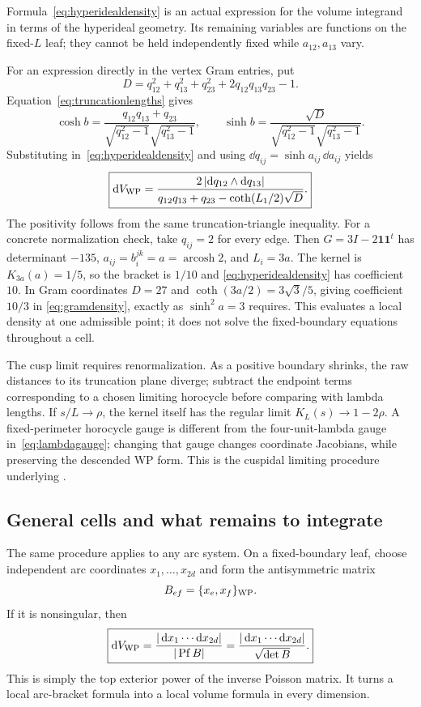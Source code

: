 Formula~\eqref{eq:hyperidealdensity} is an actual expression for the volume
integrand in terms of the hyperideal geometry. Its remaining variables are
functions on the fixed-$L$ leaf; they cannot be held independently fixed
while $a_{12},a_{13}$ vary.

For an expression directly in the vertex Gram entries, put
\[
 D=q_{12}^2+q_{13}^2+q_{23}^2+2q_{12}q_{13}q_{23}-1.
\]
Equation~\eqref{eq:truncationlengths} gives
\[
 \cosh b=\frac{q_{12}q_{13}+q_{23}}
                   {\sqrt{q_{12}^2-1}\sqrt{q_{13}^2-1}},\qquad
 \sinh b=\frac{\sqrt D}
                   {\sqrt{q_{12}^2-1}\sqrt{q_{13}^2-1}}.
\]
Substituting in~\eqref{eq:hyperidealdensity} and using
$\dd q_{ij}=\sinh a_{ij}\,\dd a_{ij}$ yields
\begin{equation}
 \boxed{
 \mathop{}\!\mathrm d V_{\mathrm{WP}}=
 \frac{2\left|\mathop{}\!\mathrm d q_{12}\wedge\mathop{}\!\mathrm d q_{13}\right|}
 {q_{12}q_{13}+q_{23}-\coth(L_1/2)\sqrt D}.}
 \label{eq:gramdensity}
\end{equation}
The positivity follows from the same truncation-triangle inequality.
For a concrete normalization check, take $q_{ij}=2$ for every edge.
Then $G=3I-2\mathbf1\mathbf1^t$ has determinant $-135$,
$a_{ij}=b_i^{jk}=a=\operatorname{arcosh}2$, and $L_i=3a$.
The kernel is $K_{3a}(a)=1/5$, so the bracket is $1/10$ and
\eqref{eq:hyperidealdensity} has coefficient $10$. In Gram coordinates
$D=27$ and $\coth(3a/2)=3\sqrt3/5$, giving coefficient $10/3$ in
\eqref{eq:gramdensity}, exactly as $\sinh^2a=3$ requires.
This evaluates a local density at one admissible point; it does not solve
the fixed-boundary equations throughout a cell.

The cusp limit requires renormalization. As a positive boundary shrinks,
the raw distances to its truncation plane diverge; subtract the endpoint
terms corresponding to a chosen limiting horocycle before comparing with
lambda lengths. If $s/L\to\rho$, the kernel itself has the regular limit
$K_L(s)\to1-2\rho$. A fixed-perimeter horocycle gauge is different from
the four-unit-lambda gauge in~\eqref{eq:lambdagauge}; changing that gauge
changes coordinate Jacobians, while preserving the descended WP form.
This is the cuspidal limiting procedure underlying
\cite[Theorem 4.5]{MondelloBoundary}.

\subsection{General cells and what remains to integrate}

The same procedure applies to any arc system. On a fixed-boundary leaf,
choose independent arc coordinates $x_1,\ldots,x_{2d}$ and form the
antisymmetric matrix
\[
 B_{ef}=\{x_e,x_f\}_{\mathrm{WP}}.
\]
If it is nonsingular, then
\begin{equation}
 \boxed{
 \mathop{}\!\mathrm d V_{\mathrm{WP}}=\frac{|\mathop{}\!\mathrm d x_1\cdots\mathop{}\!\mathrm d x_{2d}|}{|\operatorname{Pf} B|}
       =\frac{|\mathop{}\!\mathrm d x_1\cdots\mathop{}\!\mathrm d x_{2d}|}{\sqrt{\det B}}.}
 \label{eq:pfaffiandensity}
\end{equation}
This is simply the top exterior power of the inverse Poisson matrix. It
turns a local arc-bracket formula into a local volume formula in every
dimension.

